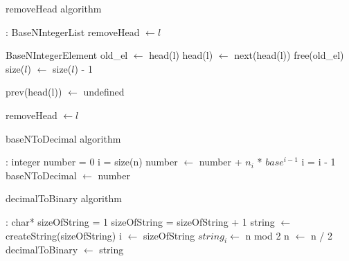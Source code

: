 \documentclass[book, nodocumentinfo]{upmethodology-document}
\begin{document}
\begin{algorithm}[H]
    \label{algo:basenintegerlist-remove-head}
    \caption{removeHead algorithm}

    \begin{algorithmic}
         : BaseNIntegerList
                \State removeHead \(\leftarrow l\)
            \EndIf

            \State BaseNIntegerElement old\_el \(\leftarrow\) head(l)
            \State head(l) \(\leftarrow\) next(head(l))
            \State free(old\_el)
            \State size(\(l\)) \(\leftarrow\) size(\(l\)) - 1

                \State prev(head(l)) \(\leftarrow\) undefined
            \EndIf
            
            \State removeHead \(\leftarrow l\)
        \EndFunction
    \end{algorithmic}
\end{algorithm}

\begin{algorithm}[H]
	\label{algo:basenintegerlist-basen-to-decimal}
	\caption{baseNToDecimal algorithm}
	
	\begin{algorithmic}
		 : integer
			\State number = 0
			\State i = size(n)
				\State number \(\leftarrow\) number + \(n_i\) * \(base^{i-1}\)
				\State i = i - 1
			\EndWhile
			\State baseNToDecimal \(\leftarrow\) number
		\EndFunction
	\end{algorithmic}
\end{algorithm}

\begin{algorithm}[H]
	\label{algo:basenintegerlist-decimalToBinary}
	\caption{decimalToBinary algorithm}
	
	\begin{algorithmic}
		 : char*
			\State sizeOfString = 1
			\While{n \(> 2^{sizeOfString}\)}
				\State sizeOfString = sizeOfString + 1
			\EndWhile
			\State string \(\leftarrow\) createString(sizeOfString)
			\State i \(\leftarrow\) sizeOfString
			\Repeat
				\State \(string_{i} \leftarrow \) n mod 2
				\State n \(\leftarrow\) n / 2
			\Until{n \(\neq\) 0}
			\State decimalToBinary \(\leftarrow\) string
		\EndFunction
	\end{algorithmic}
\end{algorithm}
\end{document}
